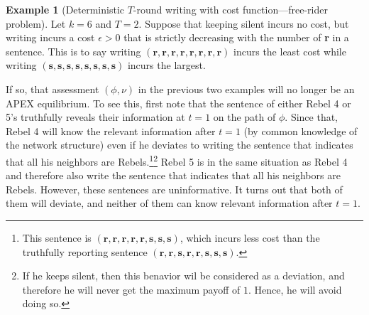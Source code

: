 \documentclass[12pt,letter]{article}
\theoremstyle{definition}
\newtheorem{example}{Example}
\theoremstyle{remark}
\theoremstyle{claim}
\begin{document}
\begin{example}[Deterministic $T$-round writing with cost function---free-rider problem]
\label{ex:cost_function_talk_fr}
Let $k=6$ and $T=2$. Suppose that keeping silent incurs no cost, but writing incurs a cost $\epsilon>0$ that is strictly decreasing with the number of \textbf{r} in a sentence. This is to say writing $(\textbf{r},\textbf{r},\textbf{r},\textbf{r},\textbf{r},\textbf{r},\textbf{r},\textbf{r})$ incurs the least cost while writing $(\textbf{s},\textbf{s},\textbf{s},\textbf{s},\textbf{s},\textbf{s},\textbf{s},\textbf{s})$ incurs the largest. 

If so, that assessment $(\phi, \nu)$ in the previous two examples will no longer be an APEX equilibrium. To see this, first note that the sentence of either Rebel 4 or 5's truthfully reveals their information at $t=1$ on the path of $\phi$. Since that, Rebel 4 will know the relevant information after $t=1$ (by common knowledge of the network structure) even if he deviates to writing the sentence that indicates that all his neighbors are Rebels.\footnote{This sentence is $(\textbf{r},\textbf{r},\textbf{r},\textbf{r},\textbf{r},\textbf{s},\textbf{s},\textbf{s})$, which incurs less cost than the truthfully reporting sentence $(\textbf{r},\textbf{r},\textbf{s},\textbf{r},\textbf{r},\textbf{s},\textbf{s},\textbf{s})$.}\footnote{If he keeps silent, then this benavior wil be considered as a deviation, and therefore he will never get the maximum payoff of $1$. Hence, he will avoid doing so.}
Rebel 5 is in the same situation as Rebel 4 and therefore also write the sentence that indicates that all his neighbors are Rebels. However, these sentences are uninformative. It turns out that both of them will deviate, and neither of them can know relevant information after $t=1$.

\end{example}
\end{document}
